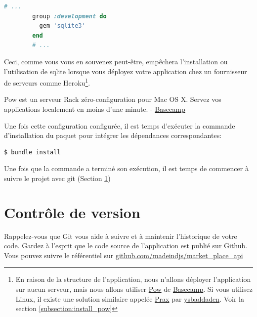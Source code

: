 \documentclass[]{report}
\begin{document}
        \begin{scriptsize}
        \begin{lstlisting}[language=ruby, caption={Le Gemfile mis à jour pour différents groupes.}, label={listing:gemfile_active _group}, breaklines]
        # ...
        group :development do
          gem 'sqlite3'
        end
        # ...
        \end{lstlisting}
        \end{scriptsize}

        Ceci, comme vous vous en souvenez peut-être, empêchera l'installation ou l'utilisation de sqlite lorsque vous déployez votre application chez un fournisseur de serveurs comme Heroku\footnote{En raison de la structure de l'application, nous n'allons déployer l'application sur aucun serveur, mais nous allons utiliser \href{http://pow.cx/}{Pow} de \href{https://basecamp.com/}{Basecamp}. Si vous utilisez Linux, il existe une solution similaire appelée \href{https://github.com/ysbaddaden/prax.cr}{Prax} par \href{https://github.com/ysbaddaden}{ysbaddaden}. Voir la section \ref{subsection:install_pow}}.

        \begin{displayquote}
          Pow est un serveur Rack zéro-configuration pour Mac OS X. Servez vos applications localement en moins d'une minute. - \href{https://basecamp.com/}{Basecamp}
        \end{displayquote}

        Une fois cette configuration configurée, il est temps d'exécuter la commande d'installation du paquet pour intégrer les dépendances correspondantes:

        \begin{scriptsize}
        \begin{lstlisting}[language=bash, breaklines]
        $ bundle install
        \end{lstlisting}
        \end{scriptsize}

        Une fois que la commande a terminé son exécution, il est temps de commencer à suivre le projet avec git (Section \ref{section:git})

  \section{Contrôle de version}\label{section:git}

    Rappelez-vous que Git vous aide à suivre et à maintenir l'historique de votre code. Gardez à l'esprit que le code source de l'application est publié sur Github. Vous pouvez suivre le référentiel sur \href{https://github.com/madeindjs/market_place_api}{github.com/madeindjs/market\_place\_api}
\end{document}
